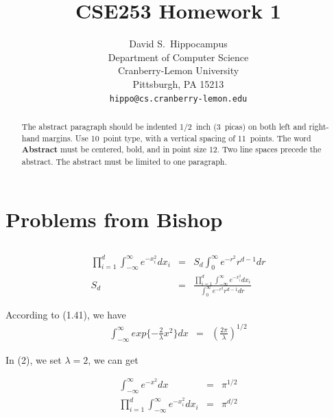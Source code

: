 \documentclass{article} %
\title{CSE253 Homework 1}
\author{
David S.~Hippocampus\\
Department of Computer Science\\
Cranberry-Lemon University\\
Pittsburgh, PA 15213 \\
\texttt{hippo@cs.cranberry-lemon.edu}
}
\begin{document}
\maketitle

\begin{abstract}
The abstract paragraph should be indented 1/2~inch (3~picas) on both left and
right-hand margins. Use 10~point type, with a vertical spacing of 11~points.
The word \textbf{Abstract} must be centered, bold, and in point size 12. Two
line spaces precede the abstract. The abstract must be limited to one
paragraph.
\end{abstract}

\section{Problems from Bishop}


\subsection{}

\begin{equation}
    \begin{array}{rcl}
        \prod\limits_{i = 1}^{d}\int_{-\infty}^{\infty}e^{-x_i^2} d x_i& = & S_d\int_{0}^{\infty}e^{-r^2}r^{d-1}dr\\
                S_d  & = & \frac{\prod\limits_{i = 1}^{d}\int_{-\infty}^{\infty}e^{-x_i^2} d x_i}{\int_{0}^{\infty}e^{-r^2}r^{d-1}dr}
    \end{array}
\end{equation}

According to (1.41),  we have
\begin{equation}
    \begin{array}{rcl}
       \int_{-\infty}^{\infty} exp\{-\frac{2}{\lambda}x^2\} dx  & =  & (\frac{2\pi}{\lambda})^{1/2}
    \end{array}
\end{equation}

In (2), we set $\lambda = 2$, we can get

\begin{equation}
    \begin{array}{rcl}
       \int_{-\infty}^{\infty} e^{-x^2} dx  & =  & \pi^{1/2} \\
        \prod\limits_{i = 1}^{d}\int_{-\infty}^{\infty}e^{-x_i^2} d x_i& = & \pi^{d/2} \\
    \end{array}
\end{equation}
\end{document}
